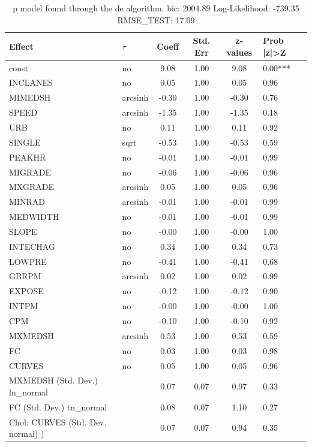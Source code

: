 \begin{table}
	\caption{p model found through the de algorithm. bic: 2004.89 Log-Likelihood: -739.35 RMSE_TEST: 17.09}
	\begin{center}
		\begin{tabular}{|l|l|c|c|c|l|}
			\hline
			Effect & $\tau$ & Coeff & Std. Err & z-values & Prob |z|>Z \\
			\hline
			const & no & 9.08 & 1.00 & 9.08 & 0.00*** \\
			\hline
			INCLANES & no & 0.05 & 1.00 & 0.05 & 0.96 \\
			\hline
			MIMEDSH & arcsinh & -0.30 & 1.00 & -0.30 & 0.76 \\
			\hline
			SPEED & arcsinh & -1.35 & 1.00 & -1.35 & 0.18 \\
			\hline
			URB & no & 0.11 & 1.00 & 0.11 & 0.92 \\
			\hline
			SINGLE & sqrt & -0.53 & 1.00 & -0.53 & 0.59 \\
			\hline
			PEAKHR & no & -0.01 & 1.00 & -0.01 & 0.99 \\
			\hline
			MIGRADE & no & -0.06 & 1.00 & -0.06 & 0.96 \\
			\hline
			MXGRADE & arcsinh & 0.05 & 1.00 & 0.05 & 0.96 \\
			\hline
			MINRAD & arcsinh & -0.01 & 1.00 & -0.01 & 0.99 \\
			\hline
			MEDWIDTH & no & -0.01 & 1.00 & -0.01 & 0.99 \\
			\hline
			SLOPE & no & -0.00 & 1.00 & -0.00 & 1.00 \\
			\hline
			INTECHAG & no & 0.34 & 1.00 & 0.34 & 0.73 \\
			\hline
			LOWPRE & no & -0.41 & 1.00 & -0.41 & 0.68 \\
			\hline
			GBRPM & arcsinh & 0.02 & 1.00 & 0.02 & 0.99 \\
			\hline
			EXPOSE & no & -0.12 & 1.00 & -0.12 & 0.90 \\
			\hline
			INTPM & no & -0.00 & 1.00 & -0.00 & 1.00 \\
			\hline
			CPM & no & -0.10 & 1.00 & -0.10 & 0.92 \\
			\hline
			MXMEDSH & arcsinh & 0.53 & 1.00 & 0.53 & 0.59 \\
			\hline
			FC & no & 0.03 & 1.00 & 0.03 & 0.98 \\
			\hline
			CURVES & no & 0.05 & 1.00 & 0.05 & 0.96 \\
			\hline
			MXMEDSH (Std. Dev.) ln_normal &  & 0.07 & 0.07 & 0.97 & 0.33 \\
			\hline
			FC (Std. Dev.) tn_normal &  & 0.08 & 0.07 & 1.10 & 0.27 \\
			\hline
			 Chol: CURVES (Std. Dev. normal) ) &  & 0.07 & 0.07 & 0.94 & 0.35 \\
			\hline
		\end{tabular}
	\end{center}
\end{table}
